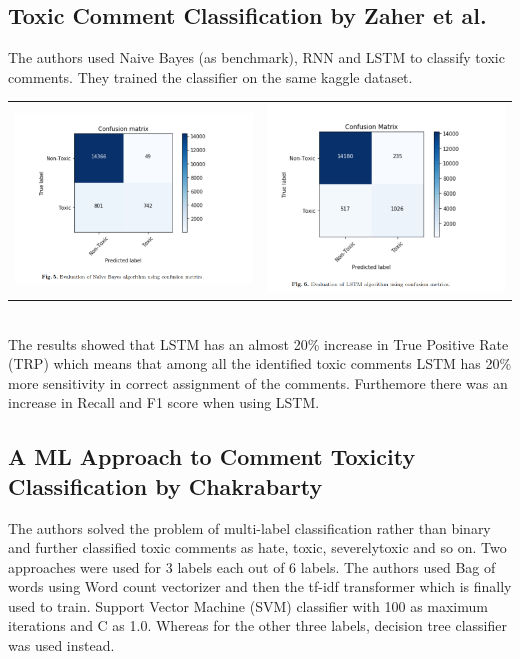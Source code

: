 \documentclass[11pt]{article}
\begin{document}
\subsection*{Toxic Comment Classification by Zaher et al.}
The authors used Naive Bayes (as benchmark), RNN and LSTM to classify toxic comments. They trained the classifier on the same kaggle dataset. 
	\\
	\begin{tabular}{cc}
		\includegraphics[width=65mm]{figs/zaher_bayes.png} & \includegraphics[width=65mm]{figs/zaher_lstm.png} 
	\end{tabular} \\
The results showed that LSTM has an almost 20\% increase in True Positive Rate (TRP) which means that among all the identified toxic comments
LSTM has 20\% more sensitivity in correct assignment of the comments. Furthemore there was an increase in Recall and F1 score when using LSTM.

\subsection*{A ML Approach to Comment Toxicity Classification by Chakrabarty}
The authors solved the problem of multi-label 
classification rather than binary and further classified toxic comments as hate, toxic, severelytoxic and so on. 
Two approaches were used for 3 labels each out of 6 labels. 
The authors used Bag of words using Word count vectorizer and then the tf-idf transformer which is finally used to train. Support Vector Machine (SVM) classifier with 100 as maximum iterations and C as 1.0. Whereas for the other three labels, decision tree classifier was used instead.
\end{document}
